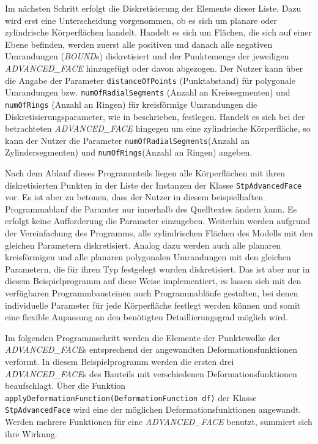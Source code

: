 Im nächsten Schritt erfolgt die Diskretisierung der Elemente dieser Liste. 
Dazu wird erst eine Unterscheidung vorgenommen, ob es sich um planare oder zylindrische Körperflächen handelt. 
Handelt es sich um Flächen, die sich auf einer Ebene befinden, werden zuerst alle positiven und danach alle negativen Umrandungen (\textit{BOUND}s) diskretisiert und der Punktemenge der jeweiligen \textit{ADVANCED\_FACE} hinzugefügt oder davon abgezogen. Der Nutzer kann über die Angabe der Parameter \verb|distanceOfPoints| (Punktabstand) für polygonale Umrandungen bzw. \verb|numOfRadialSegments| (Anzahl an Kreissegmenten) und \verb|numOfRings| (Anzahl an Ringen) für kreisförmige Umrandungen die Diskretisierungsparameter, wie in  beschrieben, festlegen.
Handelt es sich bei der betrachteten \textit{ADVANCED\_FACE} hingegen um eine zylindrische Körperfläche, so kann der Nutzer die Parameter \verb|numOfRadialSegments|(Anzahl an Zylindersegmenten) und \verb|numOfRings|(Anzahl an Ringen) angeben. 

Nach dem Ablauf dieses Programmteils liegen alle Körperflächen mit ihren diskretisierten Punkten in der Liste der Instanzen der Klasse \verb|StpAdvancedFace| vor. 
Es ist aber zu betonen, dass der Nutzer in diesem beispielhaften Programmablauf die Paramter nur innerhalb des Quelltextes ändern kann. Es erfolgt keine Aufforderung die Parameter einzugeben.
Weiterhin werden aufgrund der Vereinfachung des Programms, alle zylindrischen Flächen des Modells mit den gleichen Parametern diskretisiert. Analog dazu werden auch alle planaren kreisförmigen und alle planaren polygonalen Umrandungen mit den gleichen Parametern, die für ihren Typ festgelegt wurden diskretisiert. Das ist aber nur in diesem Beispielprogramm  auf diese Weise implementiert, es lassen sich mit den verfügbaren Programmbausteinen auch Programmabläufe gestalten, bei denen individuelle Parameter für jede Körperfläche festlegt werden können und somit eine flexible Anpassung an den benötigten Detaillierungsgrad möglich wird.          

Im folgenden Programmschritt werden die Elemente der Punktewolke der \textit{ADVANCED\_FACE}s entsprechend der angewandten Deformationsfunktionen verformt. In diesem Beispielprogramm werden die ersten drei \textit{ADVANCED\_FACE}s des Bauteils mit verschiedenen Deformationsfunktionen beaufschlagt. Über die Funktion \verb|applyDeformationFunction(DeformationFunction df)| der Klasse \verb|StpAdvancedFace| wird eine der möglichen Deformationsfunktionen angewandt.
Werden mehrere Funktionen für eine \textit{ADVANCED\_FACE} benutzt, summiert sich ihre Wirkung. 


